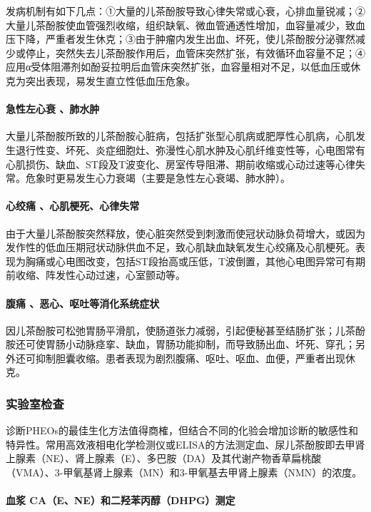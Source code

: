 发病机制有如下几点：①大量的儿茶酚胺导致心律失常或心衰，心排血量锐减；②大量儿茶酚胺使血管强烈收缩，组织缺氧、微血管通透性增加，血容量减少，致血压下降，严重者发生休克；③由于肿瘤内发生出血、坏死，使儿茶酚胺分泌骤然减少或停止，突然失去儿茶酚胺作用后，血管床突然扩张，有效循环血容量不足；④应用α受体阻滞剂如酚妥拉明后血管床突然扩张，血容量相对不足，以低血压或休克为突出表现，易发生直立性低血压危象。

\paragraph{急性左心衰 、肺水肿}

大量儿茶酚胺所致的儿茶酚胺心脏病，包括扩张型心肌病或肥厚性心肌病，心肌发生退行性变、坏死、炎症细胞灶、弥漫性心肌水肿及心肌纤维变性等，心电图常有心肌损伤、缺血、ST段及T波变化、房室传导阻滞、期前收缩或心动过速等心律失常。危象时更易发生心力衰竭（主要是急性左心衰竭、肺水肿）。

\paragraph{心绞痛 、心肌梗死、心律失常}

由于大量儿茶酚胺突然释放，使心脏突然受到刺激而使冠状动脉负荷增大，或因为发作性的低血压期冠状动脉供血不足，致心肌缺血缺氧发生心绞痛及心肌梗死。表现为胸痛或心电图改变，包括ST段抬高或压低，T波倒置，其他心电图异常可有期前收缩、阵发性心动过速，心室颤动等。

\paragraph{腹痛 、恶心、呕吐等消化系统症状}

因儿茶酚胺可松弛胃肠平滑肌，使肠道张力减弱，引起便秘甚至结肠扩张；儿茶酚胺还可使胃肠小动脉痉挛、缺血，胃肠功能抑制，而导致肠出血、坏死、穿孔；另外还可抑制胆囊收缩。患者表现为剧烈腹痛、呕吐、呕血、血便，严重者出现休克。

\subsubsection{实验室检查}

诊断PHEOs的最佳生化方法值得商榷，但结合不同的化验会增加诊断的敏感性和特异性。常用高效液相电化学检测仪或ELISA的方法测定血、尿儿茶酚胺即去甲肾上腺素（NE）、肾上腺素（E）、多巴胺（DA）及其代谢产物香草扁桃酸（VMA）、3-甲氧基肾上腺素（MN）和3-甲氧基去甲肾上腺素（NMN）的浓度。

\paragraph{血浆 CA（E、NE）和二羟苯丙醇（DHPG）测定}

